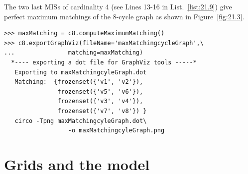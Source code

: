 The two last MISs of cardinality 4 (see Lines 13-16 in List.~\vref{list:21.9}) give perfect maximum matchings of the 8-cycle graph as shown in Figure~\vref{fig:21.3}. 
\begin{lstlisting}[caption={Computing maximum matchings in the 8-cycle graph},label=list:21.10]
>>> maxMatching = c8.computeMaximumMatching()
>>> c8.exportGraphViz(fileName='maxMatchingcycleGraph',\
...   		      matching=maxMatching)
  *---- exporting a dot file for GraphViz tools -----*
   Exporting to maxMatchingcyleGraph.dot
   Matching:  {frozenset({'v1', 'v2'}),
               frozenset({'v5', 'v6'}),
               frozenset({'v3', 'v4'}),
               frozenset({'v7', 'v8'}) }
   circo -Tpng maxMatchingcyleGraph.dot\
                  -o maxMatchingcyleGraph.png
\end{lstlisting}
	    
\section{Grids and the \Ising model}
\label{sec:21.5}

